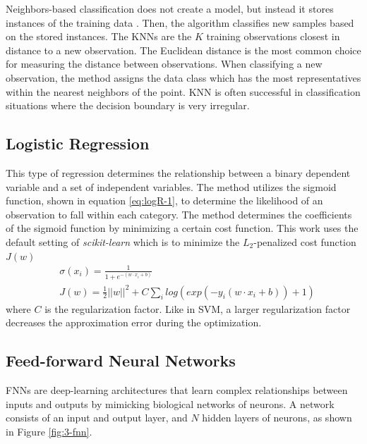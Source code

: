 
Neighbors-based classification does not create a model, but instead it stores instances of the training data \cite{pedregosa_scikit-learn_2011}.
Then, the algorithm classifies new samples based on the stored instances.
The KNNs are the $K$ training observations closest in distance to a new observation.
The Euclidean distance is the most common choice for measuring the distance between observations.
When classifying a new observation, the method assigns the data class which has the most representatives within the nearest neighbors of the point.
\gls*{KNN} is often successful in classification situations where the decision boundary is very irregular.


\subsection{Logistic Regression}


This type of regression determines the relationship between a binary dependent variable and a set of independent variables.
The method utilizes the sigmoid function, shown in equation \ref{eq:logR-1}, to determine the likelihood of an observation to fall within each category.
The method determines the coefficients of the sigmoid function by minimizing a certain cost function.
This work uses the default setting of \textit{scikit-learn} which is to minimize the $L_2$-penalized cost function $J(w)$
\begin{align}
& \sigma(x_i) = \frac{1}{1+e^{-(w \cdot x_i + b)}} \label{eq:logR-1} \\
& J(w) = \frac{1}{2} ||w||^2 + C \sum_i log(exp(-y_i(w \cdot x_i + b))+1) \label{eq:logR-2}
\end{align}
where $C$ is the regularization factor.
Like in SVM, a larger regularization factor decreases the approximation error during the optimization.


\subsection{Feed-forward Neural Networks}

\Glspl*{FNN} are deep-learning architectures that learn complex relationships between inputs and outputs by mimicking biological networks of neurons.
A network consists of an input and output layer, and $N$ hidden layers of neurons, as shown in Figure \ref{fig:3-fnn}.

